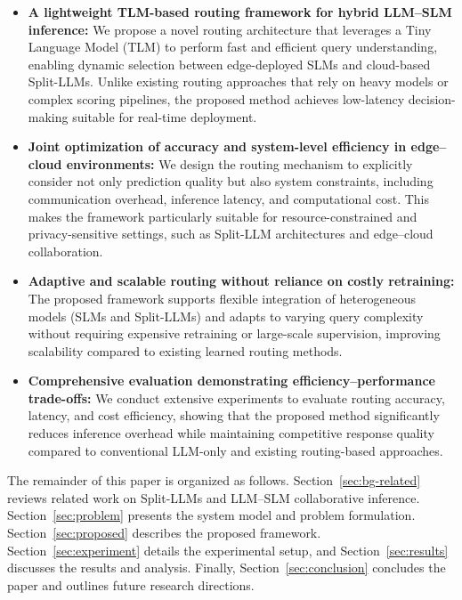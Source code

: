 \documentclass[lettersize,journal]{IEEEtran}
\begin{document}
\begin{itemize}
    \item \textbf{A lightweight TLM-based routing framework for hybrid LLM–SLM inference:} We propose a novel routing architecture that leverages a Tiny Language Model (TLM) to perform fast and efficient query understanding, enabling dynamic selection between edge-deployed SLMs and cloud-based Split-LLMs. Unlike existing routing approaches that rely on heavy models or complex scoring pipelines, the proposed method achieves low-latency decision-making suitable for real-time deployment.
    
    \item \textbf{Joint optimization of accuracy and system-level efficiency in edge–cloud environments:} We design the routing mechanism to explicitly consider not only prediction quality but also system constraints, including communication overhead, inference latency, and computational cost. This makes the framework particularly suitable for resource-constrained and privacy-sensitive settings, such as Split-LLM architectures and edge–cloud collaboration.

    \item \textbf{Adaptive and scalable routing without reliance on costly retraining:} The proposed framework supports flexible integration of heterogeneous models (SLMs and Split-LLMs) and adapts to varying query complexity without requiring expensive retraining or large-scale supervision, improving scalability compared to existing learned routing methods.

    \item \textbf{Comprehensive evaluation demonstrating efficiency–performance trade-offs:}   We conduct extensive experiments to evaluate routing accuracy, latency, and cost efficiency, showing that the proposed method significantly reduces inference overhead while maintaining competitive response quality compared to conventional LLM-only and existing routing-based approaches.
\end{itemize}

The remainder of this paper is organized as follows. Section~\ref{sec:bg-related} reviews related work on Split-LLMs and LLM–SLM collaborative inference. Section~\ref{sec:problem} presents the system model and problem formulation. Section~\ref{sec:proposed} describes the proposed framework. Section~\ref{sec:experiment} details the experimental setup, and Section~\ref{sec:results} discusses the results and analysis. Finally, Section~\ref{sec:conclusion} concludes the paper and outlines future research directions.
\end{document}
